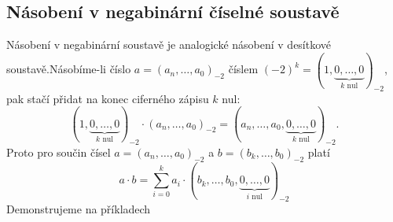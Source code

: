 \documentclass[czech,bachelor,dept470,male]{diploma}
\begin{document}
\subsection{Násobení v negabinární číselné soustavě}
Násobení v negabinární soustavě je analogické násobení v desítkové soustavě.\newline Násobíme-li číslo $a = (a_n, \dots, a_0)_{-2}$ číslem $(-2)^k = (1, \underbrace{0, \dots, 0}_{k\text{ nul}})_{-2}$, pak stačí přidat na konec ciferného zápisu $k$ nul:
$$(1, \underbrace{0, \dots, 0}_{k\text{ nul}})_{-2}\cdot(a_n, \dots, a_0)_{-2} = (a_n, \dots, a_0, \underbrace{0, \dots, 0}_{k\text{ nul}})_{-2}.$$
Proto pro součin čísel $a = (a_n, \dots, a_0)_{-2}$ a $b = (b_k, \dots, b_0)_{-2}$ platí
\begin{equation}\label{NBnase1}
	a\cdot b = \sum_{i=0}^{k} a_i\cdot(b_k, \dots, b_0, \underbrace{0, \dots, 0}_{i\text{ nul}} )_{-2}
\end{equation}
Demonstrujeme na příkladech
\end{document}
